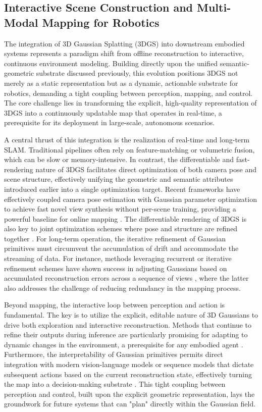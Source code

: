 \documentclass[11pt,a4paper]{article}
\begin{document}
\subsection{Interactive Scene Construction and Multi-Modal Mapping for Robotics}


The integration of 3D Gaussian Splatting (3DGS) into downstream embodied systems represents a paradigm shift from offline reconstruction to interactive, continuous environment modeling. Building directly upon the unified semantic-geometric substrate discussed previously, this evolution positions 3DGS not merely as a static representation but as a dynamic, actionable substrate for robotics, demanding a tight coupling between perception, mapping, and control. The core challenge lies in transforming the explicit, high-quality representation of 3DGS into a continuously updatable map that operates in real-time, a prerequisite for its deployment in large-scale, autonomous scenarios.

A central thrust of this integration is the realization of real-time and long-term SLAM. Traditional pipelines often rely on feature-matching or volumetric fusion, which can be slow or memory-intensive. In contrast, the differentiable and fast-rendering nature of 3DGS facilitates direct optimization of both camera pose and scene structure, effectively unifying the geometric and semantic attributes introduced earlier into a single optimization target. Recent frameworks have effectively coupled camera pose estimation with Gaussian parameter optimization to achieve fast novel view synthesis without per-scene training, providing a powerful baseline for online mapping \cite{arxiv:2411.17190v5,arxiv:2410.22128v2,arxiv:2509.17246v2}. The differentiable rendering of 3DGS is also key to joint optimization schemes where pose and structure are refined together \cite{arxiv:2504.04294v1,arxiv:2403.20309v1}. For long-term operation, the iterative refinement of Gaussian primitives must circumvent the accumulation of drift and accommodate the streaming of data. For instance, methods leveraging recurrent or iterative refinement schemes have shown success in adjusting Gaussians based on accumulated reconstruction errors across a sequence of views \cite{arxiv:2510.08575v3,arxiv:2503.06235v2}, where the latter also addresses the challenge of reducing redundancy in the mapping process.

Beyond mapping, the interactive loop between perception and action is fundamental. The key is to utilize the explicit, editable nature of 3D Gaussians to drive both exploration and interactive reconstruction. Methods that continue to refine their outputs during inference are particularly promising for adapting to dynamic changes in the environment, a prerequisite for any embodied agent \cite{arxiv:2602.22571v1}. Furthermore, the interpretability of Gaussian primitives permits direct integration with modern vision-language models or sequence models that dictate subsequent actions based on the current reconstruction state, effectively turning the map into a decision-making substrate \cite{arxiv:2410.22817v2}. This tight coupling between perception and control, built upon the explicit geometric representation, lays the groundwork for future systems that can "plan" directly within the Gaussian field.
\end{document}

